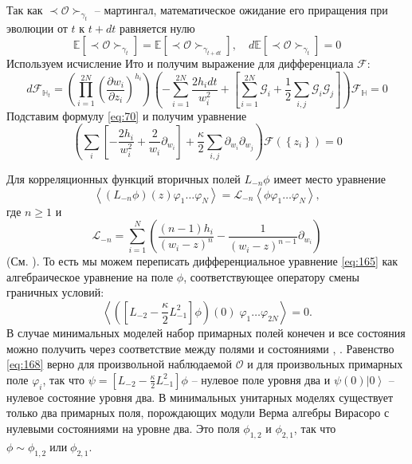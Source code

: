 Так как $ \prec\mathcal{O}\succ_{\gamma_{t}}$ --  мартингал, математическое ожидание его приращения при эволюции от  $t$ к $t+dt$ равняется нулю
\begin{equation}
  \mathbb{E}\left[\prec\mathcal{O}\succ_{\gamma_{t}}\right]=    \mathbb{E}\left[\prec\mathcal{O}\succ_{\gamma_{t+dt}}\right], \quad d\mathbb{E}\left[ \prec\mathcal{O}\succ_{\gamma_{t}}\right]=0
\label{eq:163}
\end{equation}
Используем исчисление Ито и получим выражение для дифференциала $\mathcal{F}$:
\begin{equation}
d \mathcal{F}_{\mathbb{H}_{t}}= \left(\prod_{i=1}^{2N}\left(\frac{\partial w_{i}}{\partial z_{i}}\right)^{h_{i}}\right)\left(-\sum_{i=1}^{2N}\frac{2h_{i}dt}{w_{i}^{2}}+\left[\sum_{i=1}^{2N}\mathcal{G}_{i}+\frac{1}{2}
      \sum_{i,j}\mathcal{G}_{i}\mathcal{G}_{j}\right]\right)\mathcal{F}_{\mathbb{H}}=0
\label{eq:150}
\end{equation}
Подставим формулу \eqref{eq:70} и получим уравнение
\begin{equation}
  \left( \sum_{i}\left[-\frac{2h_{i}}{w_{i}^{2}} +\frac{2}{w_{i}}\partial_{w_{i}}\right]+\frac{\kappa}{2}\sum_{i,j}\partial_{w_{i}} \partial_{w_{j}}\right)\mathcal{F}(\left\{z_{i}\right\})=0
\label{eq:165}
\end{equation}

Для корреляционных функций вторичных полей  $L_{-n}\phi$ имеет место уравнение
\begin{equation}
\left< (L_{-n}\phi)(z) \varphi_{1}\dots \varphi_{N}\right>=\mathcal{L}_{-n}\left<\phi\varphi_{1}\dots\varphi_{N}\right>,
\end{equation}
где $n\geq 1$ и
\begin{equation*}
  \mathcal{L}_{-n}=\sum_{i=1}^{N} \left(\frac{(n-1)h_{i}}{(w_{i}-z)^{n}} -\frac{1}{(w_{i}-z)^{n-1}}\partial_{w_{i}}\right)
\end{equation*}
(См. \cite{difrancesco1997cft}). То есть мы можем переписать дифференциальное уравнение \eqref{eq:165} как алгебраическое уравнение на поле $\phi$, соответствующее оператору смены граничных условий:
\begin{equation}
  \label{eq:168}
   \left<\left([L_{-2}-\frac{\kappa}{2}L_{-1}^{2}]\phi\right)(0)\; \varphi_{1}\dots \varphi_{2N}\right>=0.
\end{equation}
В случае минимальных моделей набор примарных полей конечен и все состояния можно получить через соответствие между полями и состояниями
\cite{belavin1984ics}, \cite{difrancesco1997cft}. 
Равенство \eqref{eq:168} верно для произвольной наблюдаемой $\mathcal{O}$ и для произвольных примарных поле $\varphi_{i}$, так что $\psi=[L_{-2}-\frac{\kappa}{2}L_{-1}^{2}]\phi$ -- нулевое поле уровня два и $\psi(0)\left|0\right>$ -- нулевое состояние уровня два. В минимальных унитарных моделях существует только два примарных поля, порождающих модули Верма алгебры Вирасоро с нулевыми состояниями на уровне два. Это поля $\phi_{1,2}$ и $\phi_{2,1}$, так что $\phi\sim \phi_{1,2} \;\text{или}\; \phi_{2,1}$. 

